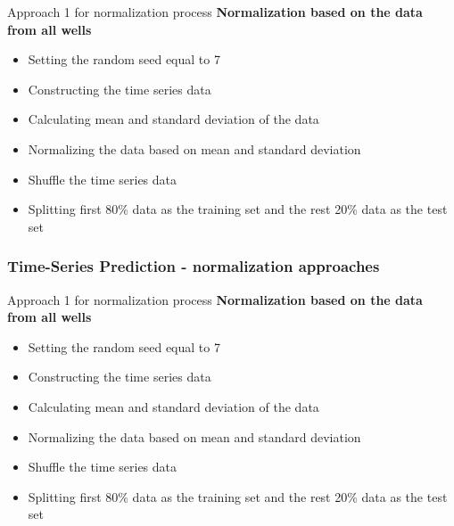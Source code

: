 \documentclass[xcolor=table]{beamer}
\begin{document}
\begin{frame}
\begin{block}{Approach 1 for normalization process}
	\textbf{Normalization based on the data from all wells}
	\begin{itemize}
		\item Setting the random seed equal to 7
		\item Constructing the time series data
		\item Calculating mean and standard deviation of the data
		\item Normalizing the data based on mean and standard deviation
		\item Shuffle the time series data
		\item Splitting first 80\% data as the training set and the rest 20\% data as the test set
	\end{itemize}
	
\end{block}

\end{frame}


\begin{frame}
\frametitle{Time-Series Prediction - normalization approaches}

\begin{block}{Approach 1 for normalization process}
\textbf{Normalization based on the data from all wells}
\begin{itemize}
\item Setting the random seed equal to 7
\item Constructing the time series data
\item Calculating mean and standard deviation of the data
\item Normalizing the data based on mean and standard deviation
\item Shuffle the time series data
\item Splitting first 80\% data as the training set and the rest 20\% data as the test set
\end{itemize}

\end{block}

\end{frame}
\end{document}
